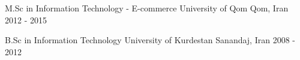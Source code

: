 

\begin{cventries}

  \eduentry
    {M.Sc in Information Technology - E-commerce} %
    {University of Qom} %
    {Qom, Iran} %
    {2012 - 2015} %
    {
    }

  \eduentry
    {B.Sc in Information Technology} %
    {University of Kurdestan} %
    {Sanandaj, Iran} %
    {2008 - 2012} %
    {
    }

\end{cventries}
